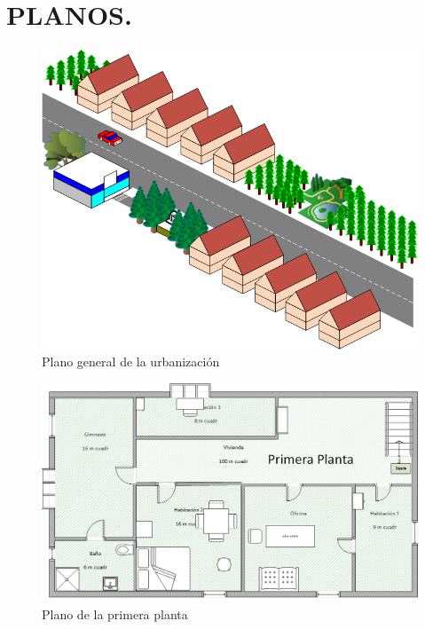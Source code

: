 \chapter{PLANOS.}

\newpage
	\begin{figure}[H]
		\centering
		\includegraphics[scale=0.90]{../img/Dibujo1.png}
		\caption{Plano general de la urbanización}
	\end{figure}


\begin{landscape}
	\begin{figure}[H]
		\centering
		\includegraphics[scale=0.80]{../img/PlanoVivienda.png}
		\caption{Plano de la primera planta}
	\end{figure}
\end{landscape}

